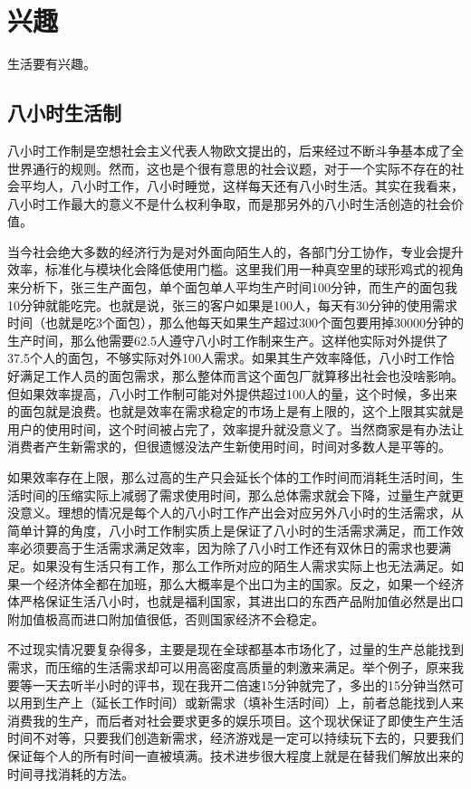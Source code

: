 \documentclass[
  letterpaper,
  DIV=11,
  numbers=noendperiod]{scrreprt}
\begin{document}

\chapter{兴趣}\label{ux5174ux8da3}

生活要有兴趣。

\section{八小时生活制}\label{ux516bux5c0fux65f6ux751fux6d3bux5236}

八小时工作制是空想社会主义代表人物欧文提出的，后来经过不断斗争基本成了全世界通行的规则。然而，这也是个很有意思的社会议题，对于一个实际不存在的社会平均人，八小时工作，八小时睡觉，这样每天还有八小时生活。其实在我看来，八小时工作最大的意义不是什么权利争取，而是那另外的八小时生活创造的社会价值。

当今社会绝大多数的经济行为是对外面向陌生人的，各部门分工协作，专业会提升效率，标准化与模块化会降低使用门槛。这里我们用一种真空里的球形鸡式的视角来分析下，张三生产面包，单个面包单人平均生产时间100分钟，而生产的面包我10分钟就能吃完。也就是说，张三的客户如果是100人，每天有30分钟的使用需求时间（也就是吃3个面包），那么他每天如果生产超过300个面包要用掉30000分钟的生产时间，那么他需要62.5人遵守八小时工作制来生产。这样他实际对外提供了37.5个人的面包，不够实际对外100人需求。如果其生产效率降低，八小时工作恰好满足工作人员的面包需求，那么整体而言这个面包厂就算移出社会也没啥影响。但如果效率提高，八小时工作制可能对外提供超过100人的量，这个时候，多出来的面包就是浪费。也就是效率在需求稳定的市场上是有上限的，这个上限其实就是用户的使用时间，这个时间被占完了，效率提升就没意义了。当然商家是有办法让消费者产生新需求的，但很遗憾没法产生新使用时间，时间对多数人是平等的。

如果效率存在上限，那么过高的生产只会延长个体的工作时间而消耗生活时间，生活时间的压缩实际上减弱了需求使用时间，那么总体需求就会下降，过量生产就更没意义。理想的情况是每个人的八小时工作产出会对应另外八小时的生活需求，从简单计算的角度，八小时工作制实质上是保证了八小时的生活需求满足，而工作效率必须要高于生活需求满足效率，因为除了八小时工作还有双休日的需求也要满足。如果没有生活只有工作，那么工作所对应的陌生人需求实际上也无法满足。如果一个经济体全都在加班，那么大概率是个出口为主的国家。反之，如果一个经济体严格保证生活八小时，也就是福利国家，其进出口的东西产品附加值必然是出口附加值极高而进口附加值很低，否则国家经济不会稳定。

不过现实情况要复杂得多，主要是现在全球都基本市场化了，过量的生产总能找到需求，而压缩的生活需求却可以用高密度高质量的刺激来满足。举个例子，原来我要等一天去听半小时的评书，现在我开二倍速15分钟就完了，多出的15分钟当然可以用到生产上（延长工作时间）或新需求（填补生活时间）上，前者总能找到人来消费我的生产，而后者对社会要求更多的娱乐项目。这个现状保证了即使生产生活时间不对等，只要我们创造新需求，经济游戏是一定可以持续玩下去的，只要我们保证每个人的所有时间一直被填满。技术进步很大程度上就是在替我们解放出来的时间寻找消耗的方法。
\end{document}
